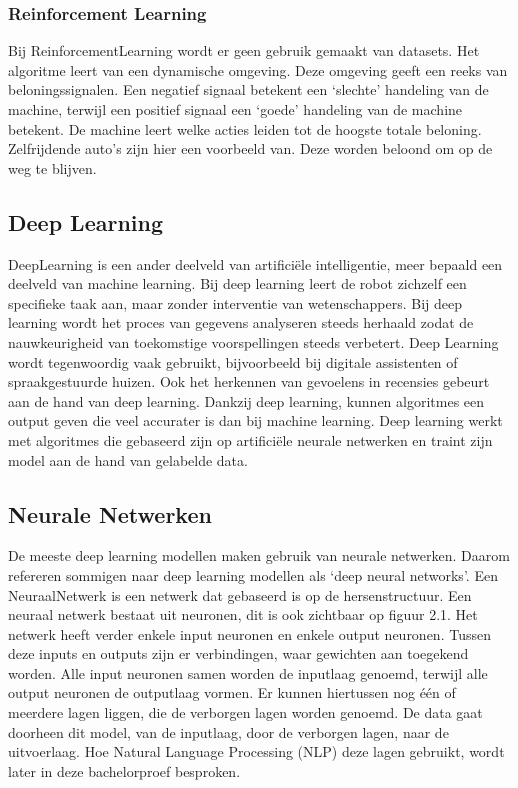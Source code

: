 \subsubsection{Reinforcement Learning}
\label{sec:reinforcementlearning}
Bij \gls{ReinforcementLearning} wordt er geen gebruik gemaakt van datasets. Het algoritme leert van een dynamische omgeving. Deze omgeving geeft een reeks van beloningssignalen. Een negatief signaal betekent een ‘slechte’ handeling van de machine, terwijl een positief signaal een ‘goede’ handeling van de machine betekent. De machine leert welke acties leiden tot de hoogste totale beloning. \autocite{Lievens2020} Zelfrijdende auto's zijn hier een voorbeeld van. Deze worden beloond om op de weg te blijven.
 
\subsection{Deep Learning}
\label{sec:deeplearning}
\gls{DeepLearning} is een ander deelveld van artificiële intelligentie, meer bepaald een deelveld van machine learning. Bij deep learning leert de robot zichzelf een specifieke taak aan, maar zonder interventie van wetenschappers. \autocite{IBM2020} Bij deep learning wordt het proces van gegevens analyseren steeds herhaald zodat de nauwkeurigheid van toekomstige voorspellingen steeds verbetert. Deep Learning wordt tegenwoordig vaak gebruikt, bijvoorbeeld bij digitale assistenten of spraakgestuurde huizen. \autocite{IBM2020}
Ook het herkennen van gevoelens in recensies gebeurt aan de hand van deep learning. 
Dankzij deep learning, kunnen algoritmes een output geven die veel accurater is dan bij machine learning. Deep learning werkt met algoritmes die gebaseerd zijn op artificiële neurale netwerken en traint zijn model aan de hand van gelabelde data.


\subsection{Neurale Netwerken}
\label{sec:neuralnetworks}

De meeste deep learning modellen maken gebruik van neurale netwerken. Daarom refereren sommigen naar deep learning modellen als ‘deep neural networks’. 
Een \gls{NeuraalNetwerk} is een netwerk dat gebaseerd is op de hersenstructuur. Een neuraal netwerk bestaat uit neuronen, dit is ook zichtbaar op figuur 2.1. Het netwerk heeft verder enkele input neuronen en enkele output neuronen. Tussen deze inputs en outputs zijn er verbindingen, waar gewichten aan toegekend worden. Alle input neuronen samen worden de inputlaag genoemd, terwijl alle output neuronen de outputlaag vormen. Er kunnen hiertussen nog één of meerdere lagen liggen, die de verborgen lagen worden genoemd. De data gaat doorheen dit model, van de inputlaag, door de verborgen lagen, naar de uitvoerlaag. Hoe Natural Language Processing (NLP) deze lagen gebruikt, wordt later in deze bachelorproef besproken. \autocite{Vervoort2017}

